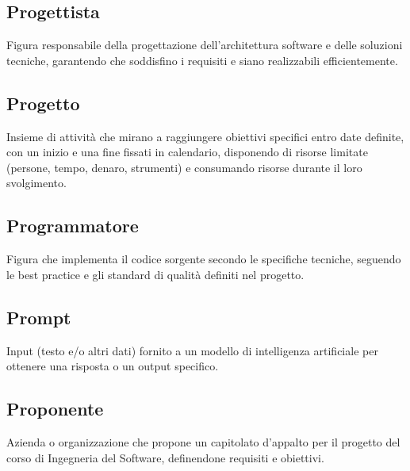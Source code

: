 \documentclass[a4paper,11pt]{article}
\begin{document}
\subsection{Progettista}
Figura responsabile della progettazione dell'architettura software e delle soluzioni tecniche, garantendo che soddisfino i requisiti e siano realizzabili efficientemente.









\subsection{Progetto}
Insieme di attività che mirano a raggiungere obiettivi specifici entro date definite, con un inizio e una fine fissati in calendario, disponendo di risorse limitate (persone, tempo, denaro, strumenti) e consumando risorse durante il loro svolgimento.








\subsection{Programmatore}
Figura che implementa il codice sorgente secondo le specifiche tecniche, seguendo le best practice e gli standard di qualità definiti nel progetto.









\subsection{Prompt}
Input (testo e/o altri dati) fornito a un modello di intelligenza artificiale per ottenere una risposta o un output specifico.









\subsection{Proponente}
Azienda o organizzazione che propone un capitolato d'appalto per il progetto del corso di Ingegneria del Software, definendone requisiti e obiettivi.
\end{document}
